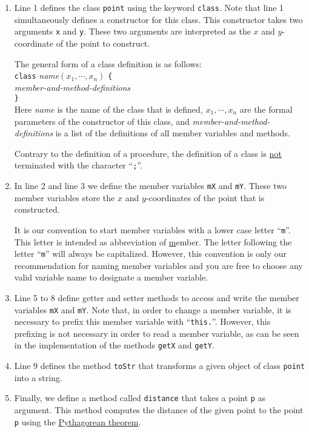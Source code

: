 \begin{enumerate}
\item Line 1 defines the class \texttt{point} using the keyword \texttt{class}.  Note that
      line 1 simultaneously defines a constructor for this class.  This constructor takes two
      arguments \texttt{x} and \texttt{y}.  These two arguments are interpreted as the $x$ and
      $y$-coordinate of the point to construct.

      The general form of a class definition is as follows:
      \\[0.2cm]
      \hspace*{1.3cm}
      \texttt{class} \textsl{name}$(x_1, \cdots, x_n)$ \texttt{\{}  
      \\
      \hspace*{2.0cm} \textsl{member-and-method-definitions}
      \\
      \hspace*{1.3cm}
      \texttt{\}}
      \\[0.2cm]
      Here \textsl{name} is the name of the class that is defined, $x_1, \cdots, x_n$ are the formal
      parameters of the constructor of this class, and \textsl{member-and-method-definitions} is a
      list of the definitions of all member variables and methods.

      Contrary to the definition of a procedure, the definition of a class is \underline{not}
      terminated with the character ``\texttt{;}''.
\item In line 2 and line 3 we define the member variables \texttt{mX} and \texttt{mY}.  These two
      member variables store the $x$ and $y$-coordinates of the point that is constructed.

      It is our convention to start member variables with a lower case letter ``\texttt{m}''.  This
      letter is intended as abbreviation of \underline{m}ember.  The letter following the letter
      ``\texttt{m}'' will always be capitalized.  However, this convention is only our
      recommendation for naming member variables and you are free to choose any valid variable name
      to designate a member variable.
\item Line 5 to 8 define getter and setter methods to access and write the member variables
      \texttt{mX} and \texttt{mY}.  Note that, in order to change a member variable, it is necessary
      to prefix this member variable with ``\texttt{this.}''.  However, this prefixing is not
      necessary in order to read a member variable, as can be seen in the implementation of the
      methods \texttt{getX} and \texttt{getY}.
\item Line 9 defines the method \texttt{toStr} that transforms a given object of class
      \texttt{point} into a string.
\item Finally, we define a method called \texttt{distance} that takes a point \texttt{p} as
      argument.  This method computes the distance of the given point to the point \texttt{p}
      using the \href{http://en.wikipedia.org/wiki/Pythagorean_theorem}{Pythagorean theorem}.
\end{enumerate}
